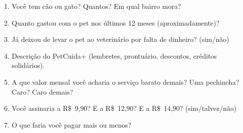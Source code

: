 \begin{enumerate}
  \item Você tem cão ou gato? Quantos? Em qual bairro mora?
  \item Quanto gastou com o pet nos últimos 12 meses (aproximadamente)?
  \item Já deixou de levar o pet ao veterinário por falta de dinheiro? (sim/não)
  \item Descrição do PetCuida+ (lembretes, prontuário, descontos, créditos solidários).
  \item A que valor mensal você acharia o serviço barato demais? Uma pechincha? Caro? Caro demais?
  \item Você assinaria a R\$~9,90? E a R\$~12,90? E a R\$~14,90? (sim/talvez/não)
  \item O que faria você pagar mais ou menos?
\end{enumerate}